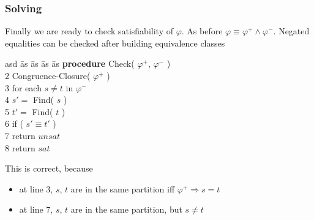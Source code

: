 \begin{frame}
  \frametitle{Solving}

  Finally we are ready to check satisfiability of $\varphi$. As before
  $\varphi \equiv \varphi^+ \wedge \varphi^-$. Negated equalities can
  be checked after building equivalence classes
  \vfill
  \begin{tabbing}
  asd \= as \= as \= as \= as  \> {\bf procedure} Check( $\varphi^+$, $\varphi^-$ ) \\
  2 \> Congruence-Closure( $\varphi^+$ ) \\
  3 \> for each $s \not= t$ in $\varphi^-$ \\
  4 \> \> $s' =$ Find( $s$ ) \\
  5 \> \> $t' =$ Find( $t$ ) \\
  6 \> \> if ( $s' \equiv t'$ ) \\
  7 \> \> \> return $unsat$ \\
  8 \> return $sat$ 
 \end{tabbing}
 \vfill\pause
 This is correct, because
 \begin{itemize}
   \item at line 3, $s$, $t$ are in the same partition iff $\varphi^+ \Rightarrow s=t$
   \item at line 7, $s$, $t$ are in the same partition, but $s\not=t$
 \end{itemize}

\end{frame}
